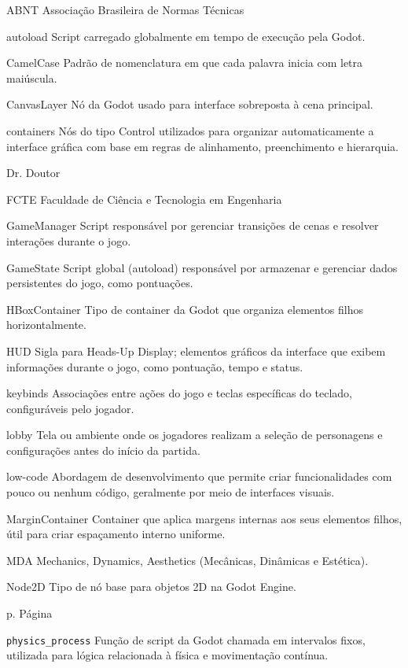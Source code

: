 \begin{siglas}
  \item[ABNT] Associação Brasileira de Normas Técnicas
  \item[autoload] Script carregado globalmente em tempo de execução pela Godot.
  \item[CamelCase] Padrão de nomenclatura em que cada palavra inicia com letra maiúscula.
  \item[CanvasLayer] Nó da Godot usado para interface sobreposta à cena principal.
  \item[containers] Nós do tipo Control utilizados para organizar automaticamente a interface gráfica com base em regras de alinhamento, preenchimento e hierarquia.
  \item[Dr.] Doutor
  \item[FCTE] Faculdade de Ciência e Tecnologia em Engenharia
  \item[GameManager] Script responsável por gerenciar transições de cenas e resolver interações durante o jogo.
  \item[GameState] Script global (autoload) responsável por armazenar e gerenciar dados persistentes do jogo, como pontuações.
  \item[HBoxContainer] Tipo de container da Godot que organiza elementos filhos horizontalmente.
  \item[HUD] Sigla para Heads-Up Display; elementos gráficos da interface que exibem informações durante o jogo, como pontuação, tempo e status.
  \item[keybinds] Associações entre ações do jogo e teclas específicas do teclado, configuráveis pelo jogador.
  \item[lobby] Tela ou ambiente onde os jogadores realizam a seleção de personagens e configurações antes do início da partida.
  \item[low-code] Abordagem de desenvolvimento que permite criar funcionalidades com pouco ou nenhum código, geralmente por meio de interfaces visuais.
  \item[MarginContainer] Container que aplica margens internas aos seus elementos filhos, útil para criar espaçamento interno uniforme.
  \item[MDA] Mechanics, Dynamics, Aesthetics (Mecânicas, Dinâmicas e Estética).
  \item[Node2D] Tipo de nó base para objetos 2D na Godot Engine.
  \item[p.] Página
  \item[\texttt{physics\_process}] Função de script da Godot chamada em intervalos fixos, utilizada para lógica relacionada à física e movimentação contínua.

\end{siglas}
